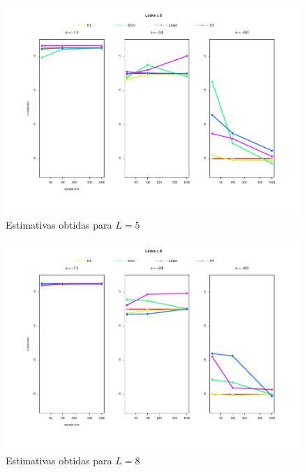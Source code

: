 \documentclass[12pt]{article}
\begin{document}
\begin{figure}[H]
     \centering
     \includegraphics[scale=0.5]{plots/estimators_L=5.pdf}
     \caption{Estimativas obtidas para $L=5$}
     \label{graf_10}
\end{figure}
\begin{figure}[H]
     \centering
     \includegraphics[scale=0.5]{plots/estimators_L=8.pdf}
     \caption{Estimativas obtidas para $L=8$}
     \label{graf_11}
\end{figure}
\end{document}
